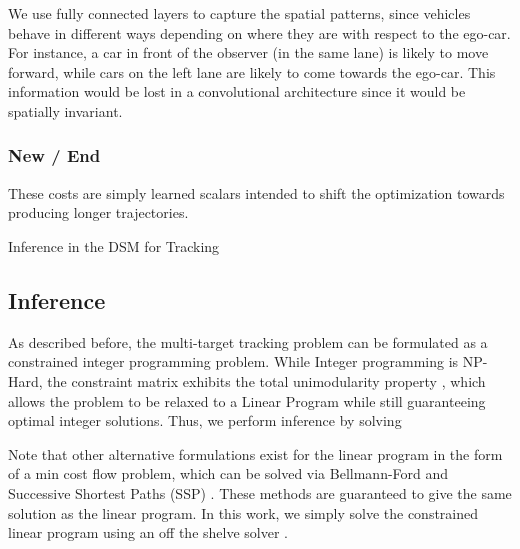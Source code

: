 \documentclass[letterpaper, 10 pt, conference]{ieeeconf}  \pdfminorversion=4
\begin{document}
We use  fully connected layers to capture the spatial patterns, since vehicles behave in different ways depending on where they are with respect to the ego-car. For instance, a car in front of the observer (in the same lane) is likely to move forward, while cars on the left lane are likely to come towards the ego-car. This information would be lost in a convolutional architecture since it would be spatially invariant.


\subsubsection{\textbf{New  / End  }}

These costs are simply learned scalars intended to shift the optimization towards producing longer trajectories.
 

\LinesNumbered
\begin{algorithm}[t]
  \caption{Inference in the DSM for Tracking\label{alg:dsm_infer}}
\end{algorithm}


\subsection{Inference }
\label{sc:dsm_inference}




As described before, the multi-target tracking problem can be formulated as a constrained integer programming problem. While Integer programming is NP-Hard, the constraint matrix exhibits the total unimodularity property \cite{berclaz}, which allows the problem to be relaxed to a Linear Program while still guaranteeing optimal integer solutions. Thus, we perform inference by solving

Note that other alternative formulations exist for the linear program in the form of a min cost flow problem, which can be solved via Bellmann-Ford \cite{bf_book} and Successive Shortest Paths (SSP) \cite{ssp_book}. These methods are guaranteed to give the same solution as the linear program. In this work, we simply solve the constrained linear program using  an off the shelve solver  \cite{ortools}.
\end{document}
